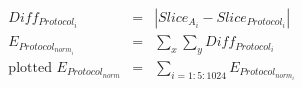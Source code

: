\documentclass{article}
\begin{document}
\begin{preview}


\begin{eqnarray}
Diff_{Protocol_{i}} &=& |Slice_{A_{i}}-Slice_{Protocol_{i}}|\\
E_{Protocol_{norm_{i}}} &=& \sum_{x}\sum_{y} Diff_{Protocol_{i}}\\
\textrm{plotted }E_{Protocol_{norm}} &=& \sum_{i=1:5:1024}E_{Protocol_{norm_{i}}}
\label{eq:}
\end{eqnarray}

\end{preview}
\end{document}
